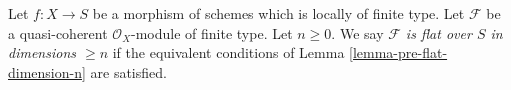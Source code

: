 \begin{definition}
\label{definition-flat-dimension-n}
Let $f : X \to S$ be a morphism of schemes which is locally of finite type.
Let $\mathcal{F}$ be a quasi-coherent $\mathcal{O}_X$-module of finite type.
Let $n \geq 0$.
We say {\it $\mathcal{F}$ is flat over $S$ in dimensions $\geq n$}
if the equivalent conditions of Lemma \ref{lemma-pre-flat-dimension-n}
are satisfied.
\end{definition}
